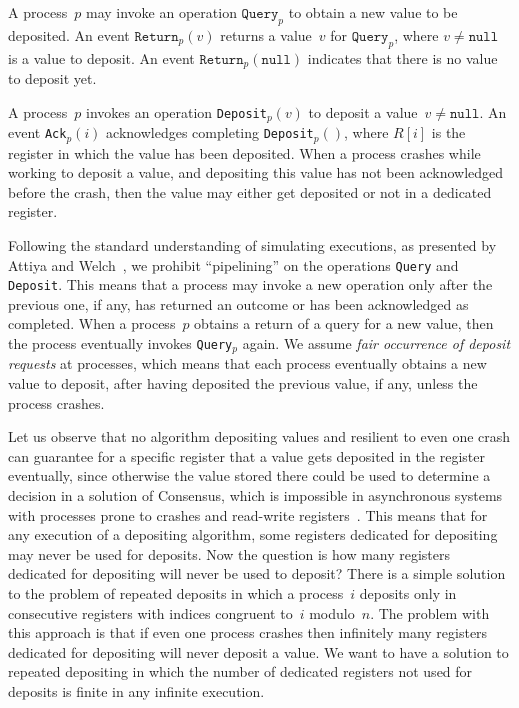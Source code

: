 \documentclass[11pt]{article}
\begin{document}
A process~$p$ may invoke an operation $\texttt{Query}_p$ to obtain a new value to be deposited.
An event $\texttt{Return}_p(v)$ returns a value~$v$ for $\texttt{Query}_p$, where $v\ne \texttt{null}$ is a value to deposit.
An event  $\texttt{Return}_p(\texttt{null})$  indicates that there is no value to deposit yet.

A process~$p$ invokes an operation \texttt{Deposit}$_p(v)$ to deposit a value~$v\ne  \texttt{null}$.
An event \texttt{Ack}$_p(i)$ acknowledges completing \texttt{Deposit}$_p()$, where $R[i]$ is the register in which the value has been deposited.
When a process crashes while working to deposit a value, and depositing this value has not been acknowledged before the crash, then the value may either get deposited or not in a dedicated register.

Following the standard understanding of simulating executions, as presented by Attiya and Welch~\cite{Attiya-Welch-book2004}, we prohibit ``pipelining'' on the operations \texttt{Query} and \texttt{Deposit}.
This means that a process may invoke a new operation only after the previous one, if any, has returned an outcome or has been acknowledged as completed.
When a process~$p$ obtains a return of a query for a new value, then the process  eventually invokes \texttt{Query}$_p$ again.
We assume \emph{fair occurrence  of deposit requests} at processes, which means that each process eventually obtains a new value to deposit, after having deposited the previous value, if any, unless the process crashes.

Let us observe that no algorithm depositing values and resilient to even one crash can guarantee for a specific register that a value gets deposited in the register eventually, since otherwise the value stored there could be used to determine  a decision in a solution of Consensus, which is impossible in asynchronous systems with processes prone to crashes and read-write registers~\cite{Attiya-Welch-book2004,HerlihyKozlovRajsbaum-book,Lynch-book96}.
This means that for any execution of a depositing algorithm, some registers dedicated for depositing may never be used for deposits.
Now the question is how many registers dedicated for depositing will never be used to deposit?
There is a simple solution to the problem of repeated deposits in which a process~$i$ deposits only in consecutive registers with indices congruent to~$i$ modulo~$n$.
The problem with this approach is that if even one process crashes then infinitely many registers dedicated for depositing will never deposit a value.
We want to have a solution to repeated depositing in which the number of dedicated registers not used for deposits is finite in any infinite execution.
\end{document}

